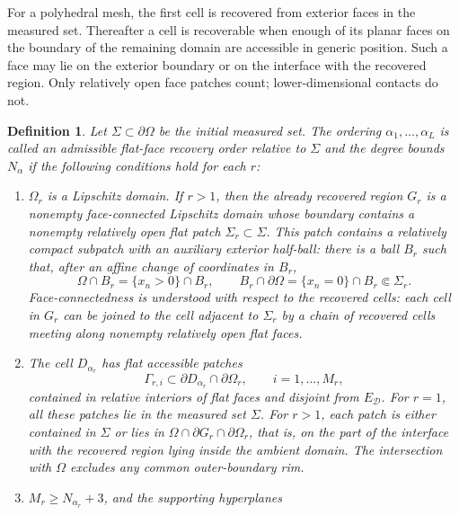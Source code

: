 \documentclass[10pt,a4paper]{amsart}
\newtheorem{definition}[theorem]{Definition}
\begin{document}
For a polyhedral mesh, the first cell is recovered from exterior faces in the
measured set.  Thereafter a cell is recoverable when enough of its planar faces
on the boundary of the remaining domain are accessible in generic position.
Such a face may lie on the exterior boundary or on the interface with the
recovered region.  Only relatively open face patches count; lower-dimensional
contacts do not.


\begin{definition}
\label{def:stripping-order}
Let \(\Sigma\subset\partial\Omega\) be the initial measured set.  The ordering
\(\alpha_1,\ldots,\alpha_L\) is called an admissible flat-face recovery order
relative to \(\Sigma\) and the degree bounds \(N_\alpha\) if the following
conditions hold for each \(r\):
\begin{enumerate}[label=(\roman*)]
  \item \(\Omega_r\) is a Lipschitz domain.  If \(r>1\), then the already
  recovered region \(G_r\) is a nonempty face-connected Lipschitz domain whose
  boundary contains a nonempty relatively open flat patch
  \(\Sigma_r\subset\Sigma\).  This patch contains a relatively compact subpatch
  with an auxiliary exterior half-ball: there is a ball \(B_r\) such that, after
  an affine change of coordinates in \(B_r\),
  \begin{equation}
    \Omega\cap B_r=\{x_n>0\}\cap B_r,
    \qquad
    B_r\cap\partial\Omega=\{x_n=0\}\cap B_r\Subset\Sigma_r .
  \end{equation}
  Face-connectedness is understood with respect to the recovered cells: each
  cell in \(G_r\) can be joined to the cell adjacent to \(\Sigma_r\) by a chain
  of recovered cells meeting along nonempty relatively open flat faces.
  \item The cell \(D_{\alpha_r}\) has flat accessible patches
  \begin{equation}
    \Gamma_{r,i}\subset \partial D_{\alpha_r}\cap\partial\Omega_r,
    \qquad i=1,\ldots,M_r,
  \end{equation}
  contained in relative interiors of flat faces and disjoint from
  \(E_{\mathcal D}\).  For \(r=1\), all these
  patches lie in the measured set \(\Sigma\).  For \(r>1\), each patch
  is either contained in \(\Sigma\) or lies in
  \(\Omega\cap\partial G_r\cap\partial\Omega_r\), that is, on the part of the
  interface with the recovered region lying inside the ambient domain.  The
  intersection with \(\Omega\) excludes any common outer-boundary rim.
  \item \(M_r\ge N_{\alpha_r}+3\), and the supporting hyperplanes

\end{enumerate}
\end{definition}
\end{document}

